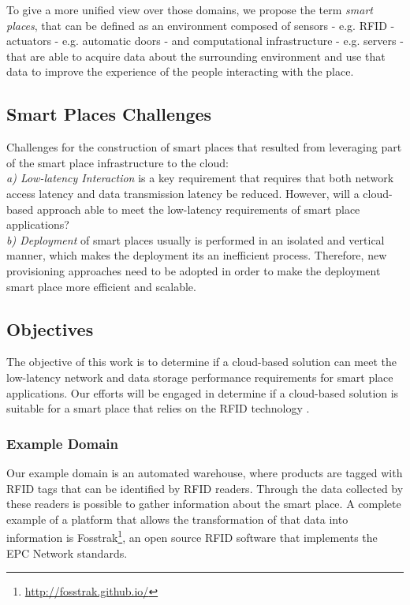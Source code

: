 To give a more unified view over those domains, we propose the term \textit{smart places},
that can be defined as an environment composed of sensors - e.g. RFID - actuators - e.g. automatic
doors - and computational infrastructure - e.g. servers - that are able to acquire data about the
surrounding environment and use that data to improve the experience of the people interacting with
the place.

\subsection{Smart Places Challenges}
\label{sub:challenges}
Challenges \cite{caceres2012ubicomp} for the construction of smart places that resulted from leveraging
part of the smart place infrastructure to the cloud:\\

\textit{a) Low-latency Interaction} is a key requirement that requires that both network access
latency and data transmission latency be reduced. However, will a cloud-based
approach able to meet the low-latency requirements of smart place applications?\\

\textit{b) Deployment} of smart places usually is performed in an isolated and vertical manner, which
makes the deployment its an inefficient process. Therefore, new provisioning approaches need to be
adopted in order to make the deployment smart place more efficient and scalable.\\

\subsection{Objectives}
\label{sub:objectives}
The objective of this work is to determine if a cloud-based solution can meet the low-latency network
and data storage performance requirements for smart place applications. Our efforts will be engaged in
determine if a cloud-based solution is suitable for a smart place that relies on the RFID technology
\cite{want2006introduction}.\\

\subsubsection{Example Domain}
\label{subs:domain}
Our example domain is an automated warehouse, where products are tagged with \gls{RFID} tags that
can be identified by \gls{RFID} readers. Through the data collected by these readers is possible to
gather information about the smart place. A complete example of a platform that allows the transformation
of that data into information is Fosstrak\footnote{\url{http://fosstrak.github.io/}}, an open
source \gls{RFID} software that implements the \gls{EPC} Network standards.\\

